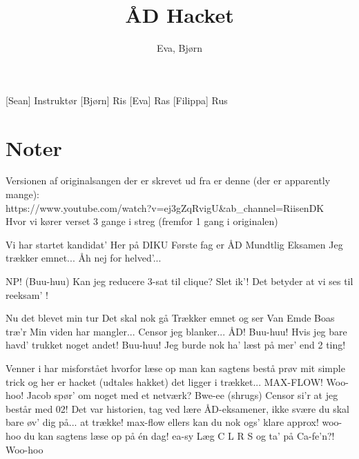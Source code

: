 \documentclass[a4paper,11pt]{article}
\title{ÅD Hacket}
\author{Eva, Bjørn}
\begin{document}
\maketitle

\begin{roles}
[Sean] Instruktør
[Bjørn] Ris
[Eva] Ras 
 [Filippa] Rus
\end{roles} 

\section*{Noter}
Versionen af originalsangen der er skrevet ud fra er denne (der er apparently mange):\\ https://www.youtube.com/watch?v=ej3gZqRvigU\&ab\_channel=RiisenDK \\
Hvor vi kører verset 3 gange i streg (fremfor 1 gang i originalen)\\

\begin{props}
\prop{}
\prop{}
\end{props}



\begin{song}
 Vi har startet kandidat'
 Her på DIKU
 Første fag er ÅD
 Mundtlig Eksamen
 Jeg trækker emnet...
Åh nej for helved'...

NP! 
(Buu-huu)
 Kan jeg reducere 3-sat 
til clique? 
 Slet ik'!
 Det betyder at vi ses 
til reeksam’ ! 

 Nu det blevet min tur
 Det skal nok gå
 Trækker emnet og ser
 Van Emde Boas træ'r
 Min viden har mangler...
Censor jeg blanker...
 ÅD!
Buu-huu!
 Hvis jeg bare havd' trukket 
noget andet!
 Buu-huu!
 Jeg burde nok ha' læst
på mer' end 2 ting!

 Venner i har misforstået
hvorfor læse op
man kan sagtens bestå
    prøv mit simple trick
og her er hacket (udtales hakket)
det ligger i trækket...
MAX-FLOW!
Woo-hoo!
 Jacob spør' om noget med
et netværk?
 Bwe-ee (shrugs)
 Censor si'r at jeg består
med 02!
 Det var historien, tag ved lære
ÅD-eksamener, ikke svære
du skal bare øv’ dig på...
 at trække! max-flow
ellers kan du nok ogs’ 
klare approx! woo-hoo
du kan sagtens læse op  
på én dag! ea-sy
 Læg C L R S og ta’ 
på Ca-fe’n?! Woo-hoo


\end{song}
\end{document}
